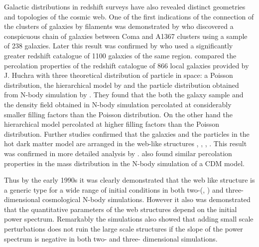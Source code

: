 \documentclass[fleqn,usenatbib,useAMS]{mnras}
\begin{document}
Galactic distributions in redshift surveys have also revealed distinct geometries and topologies of the cosmic web. One of the first indications of the connection of the clusters of galaxies by filaments was demonstrated by \cite{Gregory1978} who discovered a conspicuous chain of galaxies between Coma and A1367 clusters using a sample of 238 galaxies. Later  this result was confirmed by \cite{DeLapparent1986} who used a significantly greater redshift catalogue of 1100 galaxies of the same region. \cite{Zeldovich1982} compared the percolation properties of the redshift catalogue of 866 local galaxies provided by J. Huchra with three theoretical distribution of particle in space: a Poisson distribution, the  hierarchical model by \cite{Soneira1978} and the particle distribution obtained from N-body simulation by \cite{Klypin1983a}.  They found that the both the galaxy sample and the density field obtained in N-body simulation percolated at considerably smaller filling factors  than  the Poisson distribution. On the other hand the  hierarchical model percolated at higher filling factors  than  the Poisson distribution. Further studies confirmed that the galaxies and the particles in the hot dark matter  model are arranged in the web-like structures \cite{Zeldovich1982}, \cite{Shandarin1983}, \cite{Shandarin1983b}, \cite{Shandarin1984}. This result was confirmed in more detailed analysis by \cite{Einasto1984}. \cite{Melott1983b} also found similar percolation properties in the mass distribution in the N-body simulation of a CDM model.
 
Thus by the  early 1990s it was clearly demonstrated that the web like structure is a generic type for a wide range of initial conditions in both two-(\citealt{Melott1990}, \citealt{Beacom1991}) and three- dimensional \citep{Melott1993} cosmological N-body simulations. However it also was demonstrated that the quantitative parameters of the web structures depend on the initial  power spectrum. Remarkably the simulations also showed that  adding small scale perturbations does not ruin the large scale structures if the slope of the power spectrum is negative in both two- and three- dimensional simulations.
\end{document}

